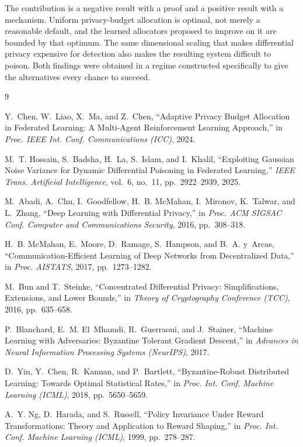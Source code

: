 The contribution is a negative result with a proof and a positive result with a
mechanism. Uniform privacy-budget allocation is optimal, not merely a reasonable
default, and the learned allocators proposed to improve on it are bounded by that
optimum. The same dimensional scaling that makes differential privacy expensive
for detection also makes the resulting system difficult to poison. Both findings
were obtained in a regime constructed specifically to give the alternatives every
chance to succeed.


\begin{thebibliography}{9}

Y.~Chen, W.~Liao, X.~Ma, and Z.~Chen,
``Adaptive Privacy Budget Allocation in Federated Learning: A Multi-Agent
Reinforcement Learning Approach,''
in \emph{Proc. IEEE Int. Conf. Communications (ICC)}, 2024.

M.~T. Hossain, S.~Badsha, H.~La, S.~Islam, and I.~Khalil,
``Exploiting Gaussian Noise Variance for Dynamic Differential Poisoning in
Federated Learning,''
\emph{IEEE Trans. Artificial Intelligence}, vol.~6, no.~11, pp.~2922--2939, 2025.

M.~Abadi, A.~Chu, I.~Goodfellow, H.~B. McMahan, I.~Mironov, K.~Talwar, and
L.~Zhang,
``Deep Learning with Differential Privacy,''
in \emph{Proc. ACM SIGSAC Conf. Computer and Communications Security}, 2016,
pp.~308--318.

H.~B. McMahan, E.~Moore, D.~Ramage, S.~Hampson, and B.~A. y~Arcas,
``Communication-Efficient Learning of Deep Networks from Decentralized Data,''
in \emph{Proc. AISTATS}, 2017, pp.~1273--1282.

M.~Bun and T.~Steinke,
``Concentrated Differential Privacy: Simplifications, Extensions, and Lower
Bounds,''
in \emph{Theory of Cryptography Conference (TCC)}, 2016, pp.~635--658.

P.~Blanchard, E.~M. El~Mhamdi, R.~Guerraoui, and J.~Stainer,
``Machine Learning with Adversaries: Byzantine Tolerant Gradient Descent,''
in \emph{Advances in Neural Information Processing Systems (NeurIPS)}, 2017.

D.~Yin, Y.~Chen, R.~Kannan, and P.~Bartlett,
``Byzantine-Robust Distributed Learning: Towards Optimal Statistical Rates,''
in \emph{Proc. Int. Conf. Machine Learning (ICML)}, 2018, pp.~5650--5659.

A.~Y. Ng, D.~Harada, and S.~Russell,
``Policy Invariance Under Reward Transformations: Theory and Application to
Reward Shaping,''
in \emph{Proc. Int. Conf. Machine Learning (ICML)}, 1999, pp.~278--287.


\end{thebibliography}
